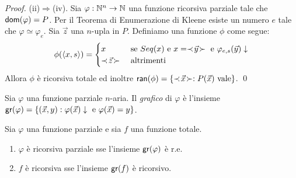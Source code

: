 \documentclass[runningheads,a4paper]{llncs}
\begin{document}
\begin{proof}
(ii)$\Rightarrow$(iv). Sia $\varphi: \mathbb{N}^n \to \mathbb{N}$ una funzione ricorsiva parziale tale che $\mathsf{dom}(\varphi) = P$. Per il Teorema di
 Enumerazione di Kleene esiste un numero $e$ tale che $\varphi \simeq \varphi_e$.
 Sia $\vec z$ una $n$-upla in $P$. Definiamo una funzione $\phi$ come segue:
$$
\phi(\langle x,s \rangle) =
\begin{cases}
x & \mbox{ se } Seq(x) \mbox{ e } x = \prec\! \vec y \!\succ \mbox{ e } \varphi_{e,s}(\vec y)\downarrow \\
\prec\! \vec z \!\succ & \mbox{ altrimenti} \\ 
\end{cases}
$$
Allora $\phi$ \`{e} ricorsiva totale ed inoltre $\mathsf{ran}(\phi) = \{\prec\! \vec x \!\succ : P(\vec x) \mbox{ vale} \}$.
\qed\end{proof}

Sia $\varphi$ una funzione parziale $n$-aria. Il \emph{grafico} di $\varphi$ \`{e} l'insieme 
 $\mathsf{gr}(\varphi) = \{(\vec x, y) : \varphi(\vec x)\downarrow \mbox{ e } \varphi(\vec x) = y\}$.

\begin{theorem}\label{thm:graph1}
Sia $\varphi$ una funzione parziale e sia $f$ una funzione totale.
\begin{enumerate}[label=(\roman*)]
\item $\varphi$ \`{e} ricorsiva parziale sse l'insieme $\mathsf{gr}(\varphi)$ \`{e} r.e.
\item $f$ \`{e} ricorsiva sse l'insieme $\mathsf{gr}(f)$ \`{e} ricorsivo.
\end{enumerate}
\end{theorem}
\end{document}
